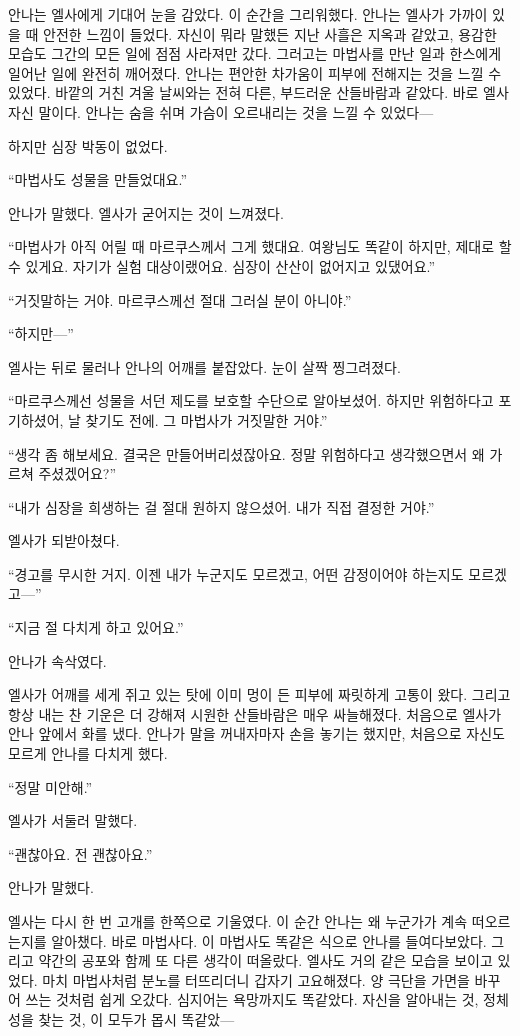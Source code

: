 안나는 엘사에게 기대어 눈을 감았다. 이 순간을 그리워했다. 안나는 엘사가 가까이 있을 때 안전한 느낌이 들었다. 자신이 뭐라 말했든 지난 사흘은 지옥과 같았고, 용감한 모습도 그간의 모든 일에 점점 사라져만 갔다. 그러고는 마법사를 만난 일과 한스에게 일어난 일에 완전히 깨어졌다. 안나는 편안한 차가움이 피부에 전해지는 것을 느낄 수 있었다. 바깥의 거친 겨울 날씨와는 전혀 다른, 부드러운 산들바람과 같았다. 바로 엘사 자신 말이다. 안나는 숨을 쉬며 가슴이 오르내리는 것을 느낄 수 있었다—

하지만 심장 박동이 없었다.

``마법사도 성물을 만들었대요.''

안나가 말했다. 엘사가 굳어지는 것이 느껴졌다.

``마법사가 아직 어릴 때 마르쿠스께서 그게 했대요. 여왕님도 똑같이 하지만, 제대로 할 수 있게요. 자기가 실험 대상이랬어요. 심장이 산산이 없어지고 있댔어요.''

``거짓말하는 거야. 마르쿠스께선 절대 그러실 분이 아니야.''

``하지만—''

엘사는 뒤로 물러나 안나의 어깨를 붙잡았다. 눈이 살짝 찡그려졌다.

``마르쿠스께선 성물을 서던 제도를 보호할 수단으로 알아보셨어. 하지만 위험하다고 포기하셨어, 날 찾기도 전에. 그 마법사가 거짓말한 거야.''

``생각 좀 해보세요. 결국은 만들어버리셨잖아요. 정말 위험하다고 생각했으면서 왜 가르쳐 주셨겠어요?''

``내가 심장을 희생하는 걸 절대 원하지 않으셨어. 내가 직접 결정한 거야.''

엘사가 되받아쳤다.

``경고를 무시한 거지. 이젠 내가 누군지도 모르겠고, 어떤 감정이어야 하는지도 모르겠고—''

``지금 절 다치게 하고 있어요.''

안나가 속삭였다.

엘사가 어깨를 세게 쥐고 있는 탓에 이미 멍이 든 피부에 짜릿하게 고통이 왔다. 그리고 항상 내는 찬 기운은 더 강해져 시원한 산들바람은 매우 싸늘해졌다. 처음으로 엘사가 안나 앞에서 화를 냈다. 안나가 말을 꺼내자마자 손을 놓기는 했지만, 처음으로 자신도 모르게 안나를 다치게 했다.

``정말 미안해.''

엘사가 서둘러 말했다.

``괜찮아요. 전 괜찮아요.''

안나가 말했다.

엘사는 다시 한 번 고개를 한쪽으로 기울였다. 이 순간 안나는 왜 누군가가 계속 떠오르는지를 알아챘다. 바로 마법사다. 이 마법사도 똑같은 식으로 안나를 들여다보았다. 그리고 약간의 공포와 함께 또 다른 생각이 떠올랐다. 엘사도 거의 같은 모습을 보이고 있었다. 마치 마법사처럼 분노를 터뜨리더니 갑자기 고요해졌다. 양 극단을 가면을 바꾸어 쓰는 것처럼 쉽게 오갔다. 심지어는 욕망까지도 똑같았다. 자신을 알아내는 것, 정체성을 찾는 것, 이 모두가 몹시 똑같았—

